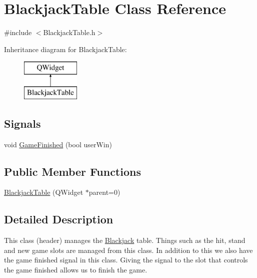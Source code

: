 \hypertarget{class_blackjack_table}{\section{Blackjack\-Table Class Reference}
\label{class_blackjack_table}
}


{\ttfamily \#include $<$Blackjack\-Table.\-h$>$}

Inheritance diagram for Blackjack\-Table\-:\begin{figure}[H]
\begin{center}
\leavevmode
\includegraphics[height=2.000000cm]{class_blackjack_table}
\end{center}
\end{figure}
\subsection*{Signals}
\begin{DoxyCompactItemize}
\item 
void \hyperlink{class_blackjack_table_a54a84c3cf0b00d6b6752ea492cda19a4}{Game\-Finished} (bool user\-Win)
\end{DoxyCompactItemize}
\subsection*{Public Member Functions}
\begin{DoxyCompactItemize}
\item 
\hyperlink{class_blackjack_table_a3b71f8e7d2458679452339977c4b3509}{Blackjack\-Table} (Q\-Widget $\ast$parent=0)
\end{DoxyCompactItemize}


\subsection{Detailed Description}
This class (header) manages the \hyperlink{class_blackjack}{Blackjack} table. Things such as the hit, stand and new game slots are managed from this class. In addition to this we also have the game finished signal in this class. Giving the signal to the slot that controls the game finished allows us to finish the game. 

